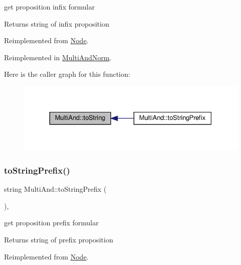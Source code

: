 get proposition infix formular 

\begin{DoxyReturn}{Returns}
string of infix proposition 
\end{DoxyReturn}


Reimplemented from \hyperlink{class_node_a0746502074a232243dcac3b96f3ce2d0}{Node}.



Reimplemented in \hyperlink{class_multi_and_norm_a84940789d331007c430096a38f60d124}{Multi\+And\+Norm}.

Here is the caller graph for this function\+:\nopagebreak
\begin{figure}[H]
\begin{center}
\leavevmode
\includegraphics[width=331pt]{d2/d2a/class_multi_and_a035299de4f81beb44a9a5df63b0d5178_icgraph}
\end{center}
\end{figure}
\mbox{\label{class_multi_and_a00dd6431f647c88e28d702dd2afb1c57}} 
\subsubsection{\texorpdfstring{to\+String\+Prefix()}{toStringPrefix()}}
{\footnotesize\ttfamily string Multi\+And\+::to\+String\+Prefix (\begin{DoxyParamCaption}{ }\end{DoxyParamCaption})\hspace{0.3cm}{\ttfamily [override]}, {\ttfamily [virtual]}}



get proposition prefix formular 

\begin{DoxyReturn}{Returns}
string of prefix proposition 
\end{DoxyReturn}


Reimplemented from \hyperlink{class_node_a815b062345cf2bb42717bd16dc99ea27}{Node}.

